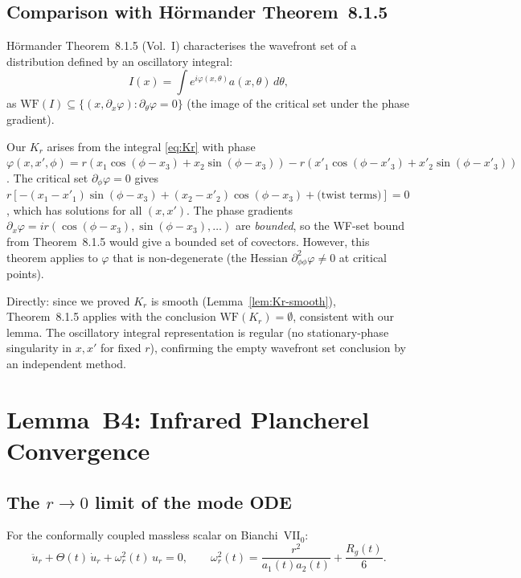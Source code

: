 \documentclass[12pt, a4paper]{article}
\theoremstyle{remark}
\newcommand{\WF}{\mathrm{WF}}
\begin{document}
\subsection{Comparison with Hörmander Theorem~8.1.5}

H\"ormander \cite{Hor90} Theorem~8.1.5 (Vol.~I) characterises the wavefront
set of a distribution defined by an oscillatory integral:
\begin{equation}
  I(x) = \int e^{i\varphi(x,\theta)} a(x,\theta)\,d\theta,
\end{equation}
as $\WF(I) \subseteq \{(x, \partial_x\varphi) : \partial_\theta \varphi = 0\}$
(the image of the critical set under the phase gradient).

Our $K_r$ arises from the integral \eqref{eq:Kr} with phase
$\varphi(x,x',\phi) = r(x_1\cos(\phi-x_3)+x_2\sin(\phi-x_3))
  - r(x'_1\cos(\phi-x'_3)+x'_2\sin(\phi-x'_3))$.
The critical set $\partial_\phi\varphi = 0$ gives
$r[-(x_1-x'_1)\sin(\phi-x_3) + (x_2-x'_2)\cos(\phi-x_3)
  + \text{(twist terms)}] = 0$,
which has solutions for all $(x,x')$.
The phase gradients $\partial_x\varphi = ir(\cos(\phi-x_3),\sin(\phi-x_3),\ldots)$
are \emph{bounded}, so the WF-set bound from Theorem~8.1.5 would give
a bounded set of covectors.  However, this theorem applies to
$\varphi$ that is non-degenerate (the Hessian $\partial^2_{\phi\phi}\varphi \ne 0$
at critical points).

Directly: since we proved $K_r$ is smooth (Lemma~\ref{lem:Kr-smooth}),
Theorem~8.1.5 applies with the conclusion $\WF(K_r) = \emptyset$,
consistent with our lemma.  The oscillatory integral representation is
regular (no stationary-phase singularity in $x,x'$ for fixed $r$),
confirming the empty wavefront set conclusion by an independent method.

\section{Lemma~B4: Infrared Plancherel Convergence}
\label{sec:LemmaB4}

\subsection{The $r \to 0$ limit of the mode ODE}

For the conformally coupled massless scalar on Bianchi~VII$_0$:
\begin{equation}\label{eq:mode-ODE}
  \ddot{u}_r + \Theta(t)\,\dot{u}_r
  + \omega_r^2(t)\,u_r = 0,
  \qquad
  \omega_r^2(t) = \frac{r^2}{a_1(t)a_2(t)} + \frac{R_g(t)}{6}.
\end{equation}
\end{document}
